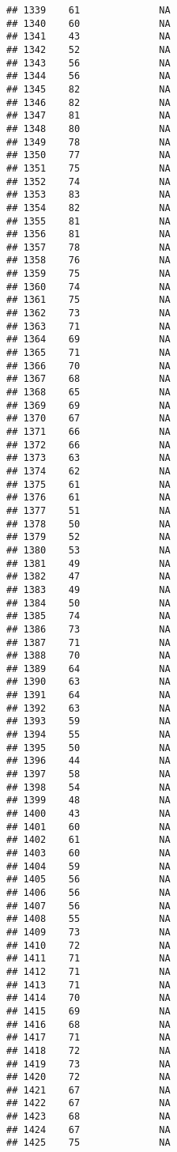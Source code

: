 \documentclass[]{article}
\begin{document}
\begin{verbatim}
## 1339    61              NA
## 1340    60              NA
## 1341    43              NA
## 1342    52              NA
## 1343    56              NA
## 1344    56              NA
## 1345    82              NA
## 1346    82              NA
## 1347    81              NA
## 1348    80              NA
## 1349    78              NA
## 1350    77              NA
## 1351    75              NA
## 1352    74              NA
## 1353    83              NA
## 1354    82              NA
## 1355    81              NA
## 1356    81              NA
## 1357    78              NA
## 1358    76              NA
## 1359    75              NA
## 1360    74              NA
## 1361    75              NA
## 1362    73              NA
## 1363    71              NA
## 1364    69              NA
## 1365    71              NA
## 1366    70              NA
## 1367    68              NA
## 1368    65              NA
## 1369    69              NA
## 1370    67              NA
## 1371    66              NA
## 1372    66              NA
## 1373    63              NA
## 1374    62              NA
## 1375    61              NA
## 1376    61              NA
## 1377    51              NA
## 1378    50              NA
## 1379    52              NA
## 1380    53              NA
## 1381    49              NA
## 1382    47              NA
## 1383    49              NA
## 1384    50              NA
## 1385    74              NA
## 1386    73              NA
## 1387    71              NA
## 1388    70              NA
## 1389    64              NA
## 1390    63              NA
## 1391    64              NA
## 1392    63              NA
## 1393    59              NA
## 1394    55              NA
## 1395    50              NA
## 1396    44              NA
## 1397    58              NA
## 1398    54              NA
## 1399    48              NA
## 1400    43              NA
## 1401    60              NA
## 1402    61              NA
## 1403    60              NA
## 1404    59              NA
## 1405    56              NA
## 1406    56              NA
## 1407    56              NA
## 1408    55              NA
## 1409    73              NA
## 1410    72              NA
## 1411    71              NA
## 1412    71              NA
## 1413    71              NA
## 1414    70              NA
## 1415    69              NA
## 1416    68              NA
## 1417    71              NA
## 1418    72              NA
## 1419    73              NA
## 1420    72              NA
## 1421    67              NA
## 1422    67              NA
## 1423    68              NA
## 1424    67              NA
## 1425    75              NA

\end{verbatim}
\end{document}
